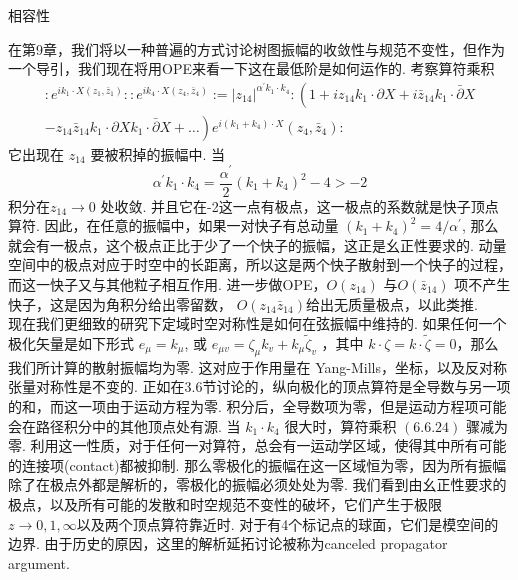 \centerline{\Large 相容性}
在第9章，我们将以一种普遍的方式讨论树图振幅的收敛性与规范不变性，但作为一个导引，我们现在将用OPE来看一下这在最低阶是如何运作的. 考察算符乘积
\begin{equation}
	\begin{gathered}
		: e^{i k_{1} \cdot X\left(z_{1}, \bar{z}_{1}\right)}:: e^{i k_{4} \cdot X\left(z_{4}, \bar{z}_{4}\right)}:=\left|z_{14}\right|^{\alpha^{\prime} k_{1} \cdot k_{4}}:\left(1+i z_{14} k_{1} \cdot \partial X+i \bar{z}_{14} k_{1} \cdot \bar{\partial} X\right. \\
		\left.-z_{14} \bar{z}_{14} k_{1} \cdot \partial X k_{1} \cdot \bar{\partial} X+\ldots\right) e^{i\left(k_{1}+k_{4}\right) \cdot X}\left(z_{4}, \bar{z}_{4}\right):
	\end{gathered}
\end{equation}
它出现在 $z_{14}$ 要被积掉的振幅中. 当 
\begin{equation}
	\alpha^{\prime} k_{1} \cdot k_{4}=\frac{\alpha^{\prime}}{2}\left(k_{1}+k_{4}\right)^{2}-4>-2
\end{equation}
积分在$z_{14} \rightarrow 0$ 处收敛. 并且它在-2这一点有极点，这一极点的系数就是快子顶点算符. 因此，在任意的振幅中，如果一对快子有总动量 $\left(k_{1}+k_{4}\right)^{2}=4 / \alpha^{\prime}$, 那么就会有一极点，这个极点正比于少了一个快子的振幅，这正是幺正性要求的. 动量空间中的极点对应于时空中的长距离，所以这是两个快子散射到一个快子的过程，而这一快子又与其他粒子相互作用. 进一步做OPE，$O\left(z_{14}\right)$ 与$O\left(\bar{z}_{14}\right)$ 项不产生快子，这是因为角积分给出零留数， $O\left(z_{14} \bar{z}_{14}\right)$给出无质量极点，以此类推.\\
现在我们更细致的研究下定域时空对称性是如何在弦振幅中维持的. 如果任何一个极化矢量是如下形式 $e_{\mu}=k_{\mu}$, 或 $e_{\mu v}=\zeta_{\mu} k_{v}+k_{\mu} \tilde{\zeta}_{v}$ ，其中 $k \cdot \zeta=k \cdot \tilde{\zeta}=0 $，那么我们所计算的散射振幅均为零. 这对应于作用量在 Yang-Mills，坐标，以及反对称张量对称性是不变的. 正如在3.6节讨论的，纵向极化的顶点算符是全导数与另一项的和，而这一项由于运动方程为零. 积分后，全导数项为零，但是运动方程项可能会在路径积分中的其他顶点处有源. 当 $k_{1} \cdot k_{4}$ 很大时，算符乘积 $(6.6 .24)$ 骤减为零. 利用这一性质，对于任何一对算符，总会有一运动学区域，使得其中所有可能的连接项(contact)都被抑制. 那么零极化的振幅在这一区域恒为零，因为所有振幅除了在极点外都是解析的，零极化的振幅必须处处为零. 我们看到由幺正性要求的极点，以及所有可能的发散和时空规范不变性的破坏，它们产生于极限 $z \rightarrow 0,1, \infty$以及两个顶点算符靠近时. 对于有4个标记点的球面，它们是模空间的边界. 由于历史的原因，这里的解析延拓讨论被称为canceled propagator argument.\\

